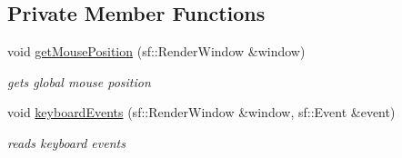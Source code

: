\subsection*{Private Member Functions}
\begin{DoxyCompactItemize}
\item 
void \hyperlink{class_engine_ac34480273d578527e8380758817e7bee}{get\+Mouse\+Position} (sf\+::\+Render\+Window \&window)
\begin{DoxyCompactList}\small\item\em gets global mouse position \end{DoxyCompactList}\item 
void \hyperlink{class_engine_af4b44a2dd17e35dfc5bb21917508627b}{keyboard\+Events} (sf\+::\+Render\+Window \&window, sf\+::\+Event \&event)
\begin{DoxyCompactList}\small\item\em reads keyboard events \end{DoxyCompactList}\end{DoxyCompactItemize}
